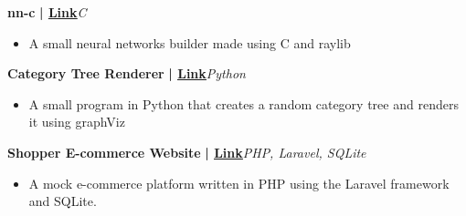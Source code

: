 \documentclass[a4paper]{article}
\begin{document}
          \vspace*{3mm}
      {\textbf{nn-c}}\textbf{ | \href{https://github.com/syedhuzaif199/nn-c}{\underline{Link}}}\hfill{\sl C}\\
          \vspace{-1mm}
\begin{itemize} \itemsep -3pt
\item[] A small neural networks builder made using C and raylib
\end{itemize}
          \vspace*{3mm}
      {\textbf{Category Tree Renderer}}\textbf{ | \href{https://github.com/syedhuzaif199/category-tree}{\underline{Link}}}\hfill{\sl Python}\\
          \vspace{-1mm}
\begin{itemize} \itemsep -3pt
\item[] A small program in Python that creates a random category tree and renders it using graphViz
\end{itemize}

        \vspace*{3mm}
      {\textbf{Shopper E-commerce Website}}\textbf{ | \href{https://github.com/syedhuzaif199/shopper}{\underline{Link}}}\hfill{\sl PHP, Laravel, SQLite}\\
          \vspace{-1mm}
\begin{itemize} \itemsep -3pt
\item[] A mock e-commerce platform written in PHP using the Laravel framework and SQLite.
\end{itemize}
\end{document}
